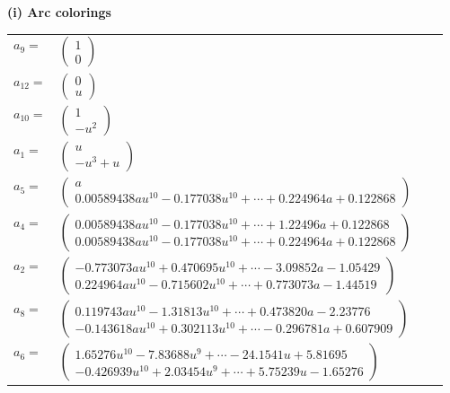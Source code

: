 \documentclass[1p]{elsarticle_modified}
\theoremstyle{definition}
\begin{document}
\flushleft \textbf{(i) Arc colorings}\\
\begin{tabular}{m{7pt} m{180pt} m{7pt} m{180pt} }
\flushright $a_{9}=$&$\begin{pmatrix}1\\0\end{pmatrix}$ \\
\flushright $a_{12}=$&$\begin{pmatrix}0\\u\end{pmatrix}$ \\
\flushright $a_{10}=$&$\begin{pmatrix}1\\- u^2\end{pmatrix}$ \\
\flushright $a_{1}=$&$\begin{pmatrix}u\\- u^3+u\end{pmatrix}$ \\
\flushright $a_{5}=$&$\begin{pmatrix}a\\0.00589438 a u^{10}-0.177038 u^{10}+\cdots+0.224964 a+0.122868\end{pmatrix}$ \\
\flushright $a_{4}=$&$\begin{pmatrix}0.00589438 a u^{10}-0.177038 u^{10}+\cdots+1.22496 a+0.122868\\0.00589438 a u^{10}-0.177038 u^{10}+\cdots+0.224964 a+0.122868\end{pmatrix}$ \\
\flushright $a_{2}=$&$\begin{pmatrix}-0.773073 a u^{10}+0.470695 u^{10}+\cdots-3.09852 a-1.05429\\0.224964 a u^{10}-0.715602 u^{10}+\cdots+0.773073 a-1.44519\end{pmatrix}$ \\
\flushright $a_{8}=$&$\begin{pmatrix}0.119743 a u^{10}-1.31813 u^{10}+\cdots+0.473820 a-2.23776\\-0.143618 a u^{10}+0.302113 u^{10}+\cdots-0.296781 a+0.607909\end{pmatrix}$ \\
\flushright $a_{6}=$&$\begin{pmatrix}1.65276 u^{10}-7.83688 u^{9}+\cdots-24.1541 u+5.81695\\-0.426939 u^{10}+2.03454 u^{9}+\cdots+5.75239 u-1.65276\end{pmatrix}$ \\

\end{tabular}
\end{document}
